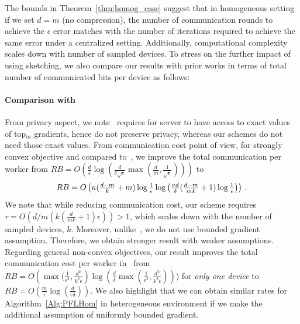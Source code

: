 \documentclass[11pt]{article}
\newcommand*{\Resize}[2]{\resizebox{#1}{!}{$#2$}}%
\begin{document}
The bounds in Theorem~\ref{thm:homog_case} suggest that in homogeneous setting if we set $d=m$ (no compression), the number of communication rounds to achieve the $\epsilon$ error matches with the number of iterations required to achieve the same error under a centralized setting. 
Additionally, computational complexity scales down with number of sampled devices. 
To stress on the further impact of using sketching, we also compare our results with prior works in terms of total number of communicated bits per device as follows:

\paragraph{Comparison with~\citet{ivkin2019communication}}
From privacy aspect, we note~\citet{ivkin2019communication} requires for server to have access to exact values of top$_m$ gradients, hence do not preserve privacy, whereas our schemes do not need those exact values. From communication cost point of view, for strongly convex objective and compared to~\citet{ivkin2019communication}, we improve the total communication per worker from 
$RB=O\left(\frac{ d}{\epsilon}\log\left(\frac{d}{\delta\sqrt{\epsilon}}\max\left(\frac{ d}{m},\frac{1}{\sqrt{\epsilon}}\right)\right)\right)$ to 
\[ \Resize{8cm}{RB=O\left(\kappa(\frac{d-m}{k}+m)\log\frac{1}{\epsilon}\log\left(\frac{\kappa d}{\delta}(\frac{d-m}{mk}+1)\log\frac{1}{\epsilon}\right)\right)}\ .\]
We note that while reducing communication cost, our scheme requires $\tau=O(d/m(k(\frac{ d}{mk}+1)\epsilon))>1$, which scales down with the number of sampled devices, $k$. 
Moreover, unlike~\citet{ivkin2019communication}, we do not use bounded gradient assumption. 
Therefore, we obtain stronger result with weaker assumptions. 
Regarding general non-convex objectives, our result improves the total communication cost per worker in~\citet{ivkin2019communication} from $RB=O\left(\max(\frac{1}{\epsilon^2},\frac{d^2}{k^2\epsilon}\right)\log(\frac{d}{\delta}\max(\frac{1}{\epsilon^2},\frac{d^2}{k^2\epsilon})))$ for \emph{only one device} to $RB=O(\frac{m}{\epsilon}\log(\frac{d}{\epsilon\delta}))$. 
We also highlight that we can obtain similar rates for Algorithm~\ref{Alg:PFLHom} in heterogeneous environment if we make the additional assumption of uniformly bounded gradient.
\end{document}
